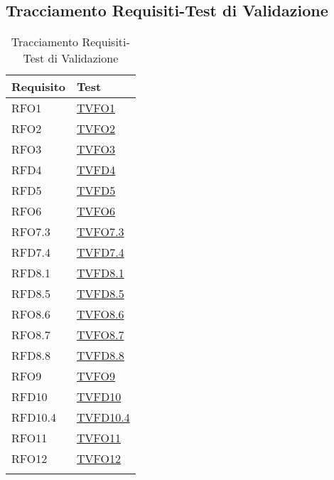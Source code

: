 \subsection{Tracciamento Requisiti-Test di Validazione}
\normalsize
\begin{longtable}[ht]{|>{\centering}m{5cm}|m{5cm}<{\centering}|}
\hline 
\textbf{Requisito} & \textbf{Test}\\
\hline
\endhead
RFO1 & \hyperlink{TVFO1}{TVFO1}\\ \hline
RFO2 & \hyperlink{TVFO2}{TVFO2}\\ \hline
RFO3 & \hyperlink{TVFO3}{TVFO3}\\ \hline
RFD4 & \hyperlink{TVFD4}{TVFD4}\\ \hline
RFD5 & \hyperlink{TVFD5}{TVFD5}\\ \hline
RFO6 & \hyperlink{TVFO6}{TVFO6}\\ \hline
RFO7.3 & \hyperlink{TVFO7.3}{TVFO7.3}\\ \hline
RFD7.4 & \hyperlink{TVFD7.4}{TVFD7.4}\\ \hline
RFD8.1 & \hyperlink{TVFD8.1}{TVFD8.1}\\ \hline
RFD8.5 & \hyperlink{TVFD8.5}{TVFD8.5}\\ \hline
RFO8.6 & \hyperlink{TVFO8.6}{TVFO8.6}\\ \hline
RFO8.7 & \hyperlink{TVFO8.7}{TVFO8.7}\\ \hline
RFD8.8 & \hyperlink{TVFD8.8}{TVFD8.8}\\ \hline
RFO9 & \hyperlink{TVFO9}{TVFO9}\\ \hline
RFD10 & \hyperlink{TVFD10}{TVFD10}\\ \hline
RFD10.4 & \hyperlink{TVFD10.4}{TVFD10.4}\\ \hline
RFO11 & \hyperlink{TVFO11}{TVFO11}\\ \hline
RFO12 & \hyperlink{TVFO12}{TVFO12}\\ \hline
\caption[Tracciamento Requisiti-Test di Validazione]{Tracciamento Requisiti-Test di Validazione}
\label{tabella:requi-tv}
\end{longtable}
\clearpage

